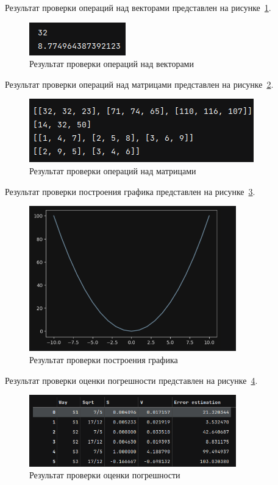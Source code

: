 \documentclass[a4paper, 14pt]{extarticle}
\begin{document}
Результат проверки операций над векторами представлен на рисунке~\ref{fig:img1}.

\begin{figure}[H]
\centering
\includegraphics{images/res1.png}
\caption{Результат проверки операций над векторами}
\label{fig:img1}
\end{figure}


Результат проверки операций над матрицами представлен на рисунке~\ref{fig:img2}.


\begin{figure}[H]
\centering
\includegraphics{images/res2.png}
\caption{Результат проверки операций над матрицами}
\label{fig:img2}
\end{figure}


Результат проверки построения графика представлен на рисунке~\ref{fig:img3}.

\begin{figure}[H]
\centering
\includegraphics[width=0.8\textwidth]{images/res3.png}
\caption{Результат проверки построения графика}
\label{fig:img3}
\end{figure}


Результат проверки оценки погрешности представлен на рисунке~\ref{fig:img4}.

\begin{figure}[H]
\centering
\includegraphics[width=0.8\textwidth]{images/res4.png}
\caption{Результат проверки оценки погрешности}
\label{fig:img4}
\end{figure}
\end{document}
